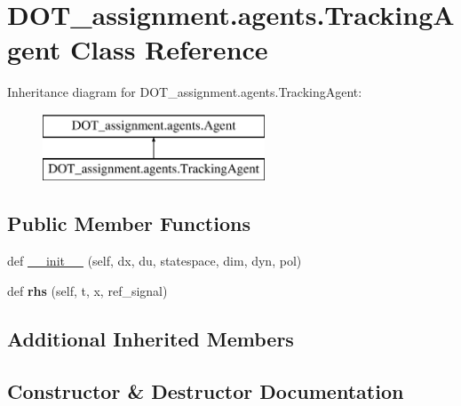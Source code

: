 \hypertarget{class_d_o_t__assignment_1_1agents_1_1_tracking_agent}{}\section{D\+O\+T\+\_\+assignment.\+agents.\+Tracking\+Agent Class Reference}
\label{class_d_o_t__assignment_1_1agents_1_1_tracking_agent}
Inheritance diagram for D\+O\+T\+\_\+assignment.\+agents.\+Tracking\+Agent\+:\begin{figure}[H]
\begin{center}
\leavevmode
\includegraphics[height=2.000000cm]{class_d_o_t__assignment_1_1agents_1_1_tracking_agent}
\end{center}
\end{figure}
\subsection*{Public Member Functions}
\begin{DoxyCompactItemize}
\item 
def \mbox{\hyperlink{class_d_o_t__assignment_1_1agents_1_1_tracking_agent_a8176e047211a3a386c4617f35fbf9d88}{\+\_\+\+\_\+init\+\_\+\+\_\+}} (self, dx, du, statespace, dim, dyn, pol)
\item 
\mbox{\label{class_d_o_t__assignment_1_1agents_1_1_tracking_agent_a792dde7a31d3dd4f2ed33473d6946b7e}} 
def {\bfseries rhs} (self, t, x, ref\+\_\+signal)
\end{DoxyCompactItemize}
\subsection*{Additional Inherited Members}


\subsection{Constructor \& Destructor Documentation}
\mbox{\label{class_d_o_t__assignment_1_1agents_1_1_tracking_agent_a8176e047211a3a386c4617f35fbf9d88}} 
